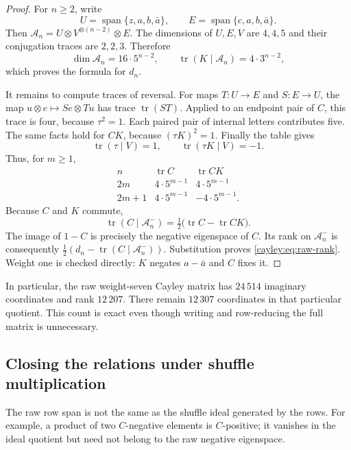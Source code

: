 \begin{proof}
For $n\ge2$, write
\[
 U=\operatorname{span}\{z,a,b,\bar a\},\qquad
 E=\operatorname{span}\{c,a,b,\bar a\}.
\]
Then $\mathcal A_n=U\otimes V^{\otimes(n-2)}\otimes E$.
The dimensions of $U,E,V$ are $4,4,5$ and their conjugation traces
are $2,2,3$.  Therefore
\[
 \dim\mathcal A_n=16\cdot5^{n-2},\qquad
 \operatorname{tr}(K\mid\mathcal A_n)=4\cdot3^{n-2},
\]
which proves the formula for $d_n$.

It remains to compute traces of reversal.  For maps $T:U\to E$ and
$S:E\to U$, the map $u\otimes e\mapsto Se\otimes Tu$ has trace
$\operatorname{tr}(ST)$.  Applied to an endpoint pair of $C$, this
trace is four, because $\tau^2=1$.  Each paired pair of internal letters
contributes five.  The same facts hold for $CK$, because $(\tau K)^2=1$.
Finally the table gives
\[
 \operatorname{tr}(\tau\mid V)=1,\qquad
 \operatorname{tr}(\tau K\mid V)=-1.
\]
Thus, for $m\ge1$,
\[
\begin{array}{c|cc}
n&\operatorname{tr}C&\operatorname{tr}CK\\ \hline
2m&4\cdot5^{m-1}&4\cdot5^{m-1}\\
2m+1&4\cdot5^{m-1}&-4\cdot5^{m-1}.
\end{array}
\]
Because $C$ and $K$ commute,
\[
 \operatorname{tr}(C\mid\mathcal A_n^-)
 =\tfrac12\bigl(\operatorname{tr}C-\operatorname{tr}CK\bigr).
\]
The image of $1-C$ is precisely the negative eigenspace of $C$.
Its rank on $\mathcal A_n^-$ is consequently
$\tfrac12(d_n-\operatorname{tr}(C\mid\mathcal A_n^-))$.
Substitution proves \eqref{cayley:eq:raw-rank}.  Weight one is checked
directly: $K$ negates $a-\bar a$ and $C$ fixes it.
\end{proof}

In particular, the raw weight-seven Cayley matrix has $24\,514$
imaginary coordinates and rank $12\,207$.  There remain $12\,307$
coordinates in that particular quotient.  This count is exact even
though writing and row-reducing the full matrix is unnecessary.

\subsection{Closing the relations under shuffle multiplication}

The raw row span is not the same as the shuffle ideal generated by the
rows.  For example, a product of two $C$-negative elements is
$C$-positive; it vanishes in the ideal quotient but need not belong to
the raw negative eigenspace.

